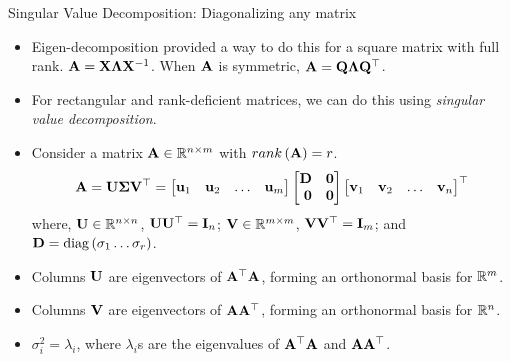 \documentclass[aspectratio=169]{beamer}
\let\olditem\item
\renewcommand{\item}{\setlength{\itemsep}{\fill}\olditem}
\def\mf{\ensuremath\mathbf}
\def\mb{\ensuremath\mathbb}
\def\lp{\ensuremath\left(}
\def\rp{\ensuremath\right)}
\def\bmx{\ensuremath\begin{bmatrix*}[r]}
\def\emx{\ensuremath\end{bmatrix*}}
\begin{document}
\begin{frame}[t]{Singular Value Decomposition: Diagonalizing any matrix}
\begin{itemize}
    \item Eigen-decomposition provided a way to do this for a square matrix with full rank. $\mf{A} = \mf{X}\mf{\Lambda}\mf{X}^{-1}$. When $\mf{A}$ is symmetric, $\mf{A} = \mf{Q}\mf{\Lambda}\mf{Q}^\top$.

    \item For rectangular and rank-deficient matrices, we can do this using \textit{singular value decomposition}.

    \item Consider a matrix $\mf{A} \in \mb{R}^{n \times m}$ with $rank\lp\mf{A}\rp = r$.
    \[ \mf{A} = \mf{U}\mf{\Sigma}\mf{V}^\top = \bmx \mf{u}_1 & \mf{u}_2 & \ldots & \mf{u}_m\emx
    \bmx \mf{D} & \mf{0}\\
    \mf{0} & \mf{0} \emx \bmx \mf{v}_1 & \mf{v}_2 & \ldots & \mf{v}_n \emx^\top\]
    where, $\mf{U} \in \mb{R}^{n \times n}$, $\mf{U}\mf{U}^\top = \mf{I}_n$; $\mf{V}\in \mb{R}^{m \times m}$, $\mf{V}\mf{V}^\top = \mf{I}_m$; and $\mf{D} = \mathrm{diag}\lp\sigma_1 \ldots \sigma_r\rp$.

    \item Columns $\mf{U}$ are eigenvectors of $\mf{A}^\top\mf{A}$, forming an orthonormal basis for $\mb{R}^m$.

    \item Columns $\mf{V}$ are eigenvectors of $\mf{A}\mf{A}^\top$, forming an orthonormal basis for $\mb{R}^n$.

    \item $\sigma_i^2 = \lambda_i$, where $\lambda_i$s are the eigenvalues of $\mf{A}^\top\mf{A}$ and $\mf{A}\mf{A}^\top$.
\end{itemize}
\end{frame}
\end{document}
